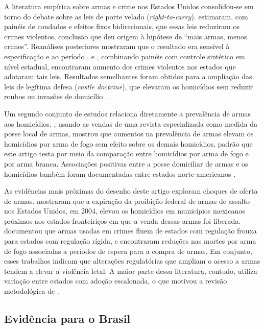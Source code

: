 \documentclass[11pt,a4paper]{article}
\begin{document}
A literatura empírica sobre armas e crime nos Estados Unidos consolidou-se em torno do debate sobre as leis de porte velado (\textit{right-to-carry}). \citet{lott1997} estimaram, com painéis de condados e efeitos fixos bidirecionais, que essas leis reduziram os crimes violentos, conclusão que deu origem à hipótese de ``mais armas, menos crimes''. Reanálises posteriores mostraram que o resultado era sensível à especificação e ao período \citep{ayres2003}, e \citet{donohue2019}, combinando painéis com controle sintético em nível estadual, encontraram aumento dos crimes violentos nos estados que adotaram tais leis. Resultados semelhantes foram obtidos para a ampliação das leis de legítima defesa (\textit{castle doctrine}), que elevaram os homicídios sem reduzir roubos ou invasões de domicílio \citep{cheng2013}.

Um segundo conjunto de estudos relaciona diretamente a prevalência de armas aos homicídios. \citet{duggan2001}, usando as vendas de uma revista especializada como medida da posse local de armas, mostrou que aumentos na prevalência de armas elevam os homicídios por arma de fogo sem efeito sobre os demais homicídios, padrão que este artigo testa por meio da comparação entre homicídios por arma de fogo e por arma branca. Associações positivas entre a posse domiciliar de armas e os homicídios também foram documentadas entre estados norte-americanos \citep{miller2007,siegel2013}.

As evidências mais próximas do desenho deste artigo exploram choques de oferta de armas. \citet{dube2013} mostraram que a expiração da proibição federal de armas de assalto nos Estados Unidos, em 2004, elevou os homicídios em municípios mexicanos próximos aos estados fronteiriços em que a venda dessas armas foi liberada. \citet{knight2013} documentou que armas usadas em crimes fluem de estados com regulação frouxa para estados com regulação rígida, e \citet{luca2017} encontraram reduções nas mortes por arma de fogo associadas a períodos de espera para a compra de armas. Em conjunto, esses trabalhos indicam que alterações regulatórias que ampliam o acesso a armas tendem a elevar a violência letal. A maior parte dessa literatura, contudo, utiliza variação entre estados com adoção escalonada, o que motivou a revisão metodológica de \citet{benmichael2024}.

\subsection{Evidência para o Brasil}
\end{document}
